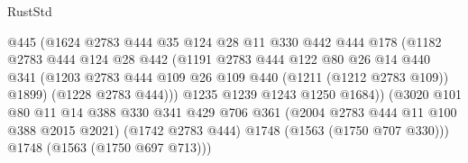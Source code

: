 \begin{lexlean}{RustStd}
\begin{coremodule}
                                  @445
                                  (@1624
                                    @2783
                                    @444
                                    @35
                                    @124
                                    @28
                                    @11
                                    @330
                                    @442
                                    @444
                                    @178
                                    (@1182
                                      @2783
                                      @444
                                      @124
                                      @28
                                      @442
                                      (@1191
                                        @2783
                                        @444
                                        @122
                                        @80
                                        @26
                                        @14
                                        @440
                                        @341
                                        (@1203
                                          @2783
                                          @444
                                          @109
                                          @26
                                          @109
                                          @440
                                          (@1211 (@1212 @2783 @109))
                                          @1899)
                                        (@1228 @2783 @444)))
                                    @1235
                                    @1239
                                    @1243
                                    @1250
                                    @1684))
                                (@3020
                                  @101
                                  @80
                                  @11
                                  @14
                                  @388
                                  @330
                                  @341
                                  @429
                                  @706
                                  @361
                                  (@2004 @2783 @444 @11 @100 @388 @2015 @2021)
                                  (@1742 @2783 @444)
                                  @1748
                                  (@1563 (@1750 @707 @330)))
                                @1748
                                (@1563 (@1750 @697 @713)))

\end{coremodule}
\end{lexlean}

